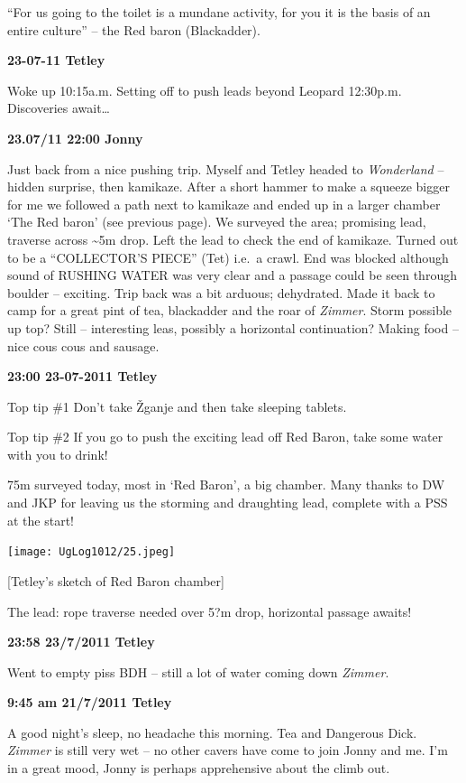 ``For us going to the toilet is a mundane activity, for you it is the
basis of an entire culture'' -- the Red baron (Blackadder).

\textbf{23-07-11 Tetley}

Woke up 10:15a.m. Setting off to push leads beyond Leopard 12:30p.m.
Discoveries await\ldots{}

\textbf{23.07/11 22:00 Jonny}

Just back from a nice pushing trip. Myself and Tetley headed to
\emph{Wonderland} -- hidden surprise, then kamikaze. After a short
hammer to make a squeeze bigger for me we followed a path next to
kamikaze and ended up in a larger chamber `The Red baron' (see previous
page). We surveyed the area; promising lead, traverse across
\textasciitilde{}5m drop. Left the lead to check the end of kamikaze.
Turned out to be a ``COLLECTOR'S PIECE'' (Tet) i.e.~a crawl. End was
blocked although sound of RUSHING WATER was very clear and a passage
could be seen through boulder -- exciting. Trip back was a bit arduous;
dehydrated. Made it back to camp for a great pint of tea, blackadder and
the roar of \emph{Zimmer}. Storm possible up top? Still -- interesting
leas, possibly a horizontal continuation? Making food -- nice cous cous
and sausage.

\textbf{23:00 23-07-2011 Tetley}

Top tip \#1 Don't take Žganje and then take sleeping tablets.

Top tip \#2 If you go to push the exciting lead off Red Baron, take some
water with you to drink!

75m surveyed today, most in `Red Baron', a big chamber. Many thanks to
DW and JKP for leaving us the storming and draughting lead, complete
with a PSS at the start!

\texttt{[image: UgLog1012/25.jpeg]}

{[}Tetley's sketch of Red Baron chamber{]}

The lead: rope traverse needed over 5?m drop, horizontal passage awaits!

\textbf{23:58 23/7/2011 Tetley}

Went to empty piss BDH -- still a lot of water coming down
\emph{Zimmer}.

\textbf{9:45 am 21/7/2011 Tetley}

A good night's sleep, no headache this morning. Tea and Dangerous Dick.
\emph{Zimmer} is still very wet -- no other cavers have come to join
Jonny and me. I'm in a great mood, Jonny is perhaps apprehensive about
the climb out.

